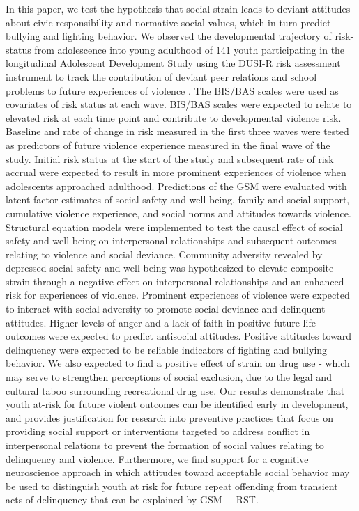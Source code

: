 \documentclass[utf8]{article}
\begin{document}
In this paper, we test the hypothesis that social strain leads to deviant attitudes about civic responsibility and normative social values, which in-turn predict bullying and fighting behavior. We observed the developmental trajectory of risk-status from adolescence into young adulthood of $141$ youth participating in the longitudinal Adolescent Development Study \citep{Fishbein2016} using the DUSI-R risk assessment instrument to track the contribution of deviant peer relations and school problems to future experiences of violence \citep{tarter1994reliability}. The BIS/BAS scales were used as covariates of risk status at each wave. BIS/BAS scales were expected to relate to elevated risk at each time point and contribute to developmental violence risk. Baseline and rate of change in risk measured in the first three waves were tested as predictors of future violence experience measured in the final wave of the study. Initial risk status at the start of the study and subsequent rate of risk accrual were expected to result in more prominent experiences of violence when adolescents approached adulthood. Predictions of the GSM were evaluated with latent factor estimates of social safety and well-being, family and social support, cumulative violence experience, and social norms and attitudes towards violence. Structural equation models were implemented to test the causal effect of social safety and well-being on interpersonal relationships and subsequent outcomes relating to violence and social deviance. Community adversity revealed by depressed social safety and well-being was hypothesized to elevate composite strain through a negative effect on interpersonal relationships and an enhanced risk for experiences of violence. Prominent experiences of violence were expected to interact with social adversity to promote social deviance and delinquent attitudes.  Higher levels of anger and a lack of faith in positive future life outcomes were expected to predict antisocial attitudes. Positive attitudes toward delinquency were expected to be reliable indicators of fighting and bullying behavior. We also expected to find a positive effect of strain on drug use - which may serve to strengthen perceptions of social exclusion, due to the legal and cultural taboo surrounding recreational drug use. Our results demonstrate that youth at-risk for future violent outcomes can be identified early in development, and provides justification for research into preventive practices that focus on providing social support or interventions targeted to address conflict in interpersonal relations to prevent the formation of social values relating to delinquency and violence. Furthermore, we find support for a cognitive neuroscience approach in which attitudes toward acceptable social behavior may be used to distinguish youth at risk for future repeat offending from transient acts of delinquency that can be explained by GSM + RST.
\end{document}
